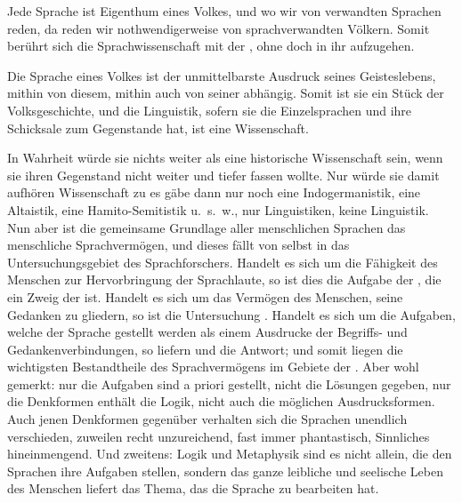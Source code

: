 Jede Sprache ist Eigenthum eines Volkes, und wo wir von verwandten Sprachen reden, da reden wir nothwendigerweise von sprachverwandten Völkern. Somit berührt sich die Sprachwissenschaft mit der , ohne doch in ihr aufzugehen.

Die Sprache eines Volkes ist der unmittelbarste Ausdruck seines Geisteslebens, mithin von diesem, mithin auch von seiner  abhängig. Somit ist sie ein Stück der Volksgeschichte, und die Linguistik, sofern sie die Einzelsprachen und ihre Schicksale zum Gegenstande hat, ist eine  Wissenschaft.

In Wahrheit würde sie nichts weiter als eine historische Wissen\-\label{fp.14}schaft sein, wenn sie ihren Gegenstand nicht weiter und tiefer fassen wollte. Nur würde sie damit aufhören  Wissenschaft zu  es gäbe dann nur noch eine Indogermanistik, eine Altaistik, eine Hamito-Semitistik u.~s.~w., nur Linguistiken, keine Linguistik. Nun aber ist die gemeinsame Grundlage aller menschlichen Sprachen das menschliche Sprachvermögen, und dieses fällt von selbst in das Untersuchungsgebiet des Sprachforschers. Handelt es sich um die Fähigkeit des Menschen zur Hervorbringung der Sprachlaute, so ist dies die Aufgabe der , die ein Zweig der  ist. Handelt es sich um das Vermögen des Menschen, seine Gedanken zu gliedern, so ist die Untersuchung . Handelt es sich um die Aufgaben, welche der Sprache gestellt werden als einem Ausdrucke der Begriffs- und Gedankenverbindungen, so liefern  und  die Antwort; und somit liegen die wichtigsten Bestandtheile des Sprachvermögens im Gebiete der . Aber wohl gemerkt: nur die Aufgaben sind a priori gestellt, nicht die Lösungen gegeben, nur die Denkformen enthält die Logik, nicht auch die möglichen Ausdrucksformen. Auch jenen Denkformen gegenüber verhalten sich die Sprachen unendlich verschieden, zuweilen recht unzureichend, fast immer phantastisch, Sinnliches hineinmengend. Und zweitens: Logik und Metaphysik sind es nicht allein, die den Sprachen ihre Aufgaben stellen, sondern das ganze leibliche und seelische Leben des Menschen liefert das Thema, das die Sprache zu bearbeiten hat. 

